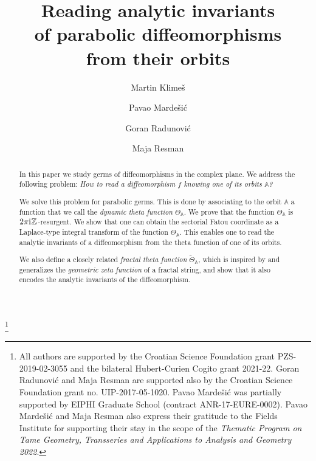 \documentclass[a4paper,11pt]{amsart}
\title[Reading analytic invariants of orbits]{Reading analytic invariants\\ of parabolic diffeomorphisms\\ from their orbits}
\author[M. Klime\v{s}]{Martin Klime\v{s}}
\author[P. Marde\v{s}i\'c]{Pavao Marde\v{s}i\'c}
\author[G. Radunovi\'c]{Goran Radunovi\'c}
\author[M. Resman]{Maja Resman}
\numberwithin{equation}{section}
\renewcommand{\i}{\mathrm{i}\mkern.25\thinmuskip}
\newcommand{\orbit}{\mathbb{A}}
\theoremstyle{definition}
\begin{document}

\thanks{All authors are  supported by the Croatian Science Foundation grant PZS-2019-02-3055 and the bilateral Hubert-Curien Cogito grant 2021-22. Goran Radunovi\' c and Maja Resman are supported also by the Croatian Science Foundation grant no. UIP-2017-05-1020. Pavao Marde\v si\' c was partially supported by  
EIPHI Graduate School (contract ANR-17-EURE-0002). Pavao Marde\v si\' c and Maja Resman also express their gratitude to the Fields Institute for supporting their stay in the scope of the \emph{Thematic Program on Tame Geometry, Transseries and Applications to Analysis and Geometry 2022}.}


\begin{abstract}
In this paper we study germs of diffeomorphisms in the complex plane. We address the following problem: \emph{How to read a diffeomorphism $f$ knowing one of its orbits $\mathbb{A}$?} 

We solve this problem for parabolic germs. 
This is done by associating to the orbit ${\mathbb{A}}$ a function that we call the \emph{dynamic theta function} $\Theta_{\mathbb{A}}$. We prove that the function $\Theta_{\mathbb{A}}$ is $2\pi\i\mathbb{Z}$-resurgent.
We show that one can obtain the sectorial Fatou coordinate as a Laplace-type integral transform of the function $\Theta_{\mathbb{A}}$.
This enables one to read the analytic invariants of a diffeomorphism from the theta function of one of its orbits. 

We also define a closely related \emph{fractal theta function} $\tilde{\Theta}_\orbit$,  
which is inspired by and generalizes  the \emph{geometric zeta function} of a fractal string, and show that it also  encodes the analytic invariants of the diffeomorphism.  
\end{abstract}


\maketitle

{\small \tableofcontents}
\end{document}

